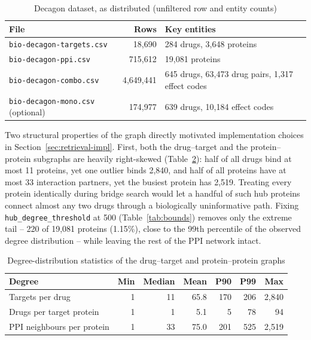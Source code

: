 \begin{table}[t]
  \caption{Decagon dataset, as distributed (unfiltered row and entity counts)}
  \label{tab:data-summary}
  \centering
  \begin{tabular}{@{}lrl@{}}
    \toprule
    File & Rows & Key entities \\
    \midrule
    \texttt{bio-decagon-targets.csv}         & 18{,}690    & 284 drugs, 3{,}648 proteins \\
    \texttt{bio-decagon-ppi.csv}             & 715{,}612   & 19{,}081 proteins \\
    \texttt{bio-decagon-combo.csv}           & 4{,}649{,}441 & 645 drugs, 63{,}473 drug pairs, 1{,}317 effect codes \\
    \texttt{bio-decagon-mono.csv} (optional) & 174{,}977   & 639 drugs, 10{,}184 effect codes \\
    \bottomrule
  \end{tabular}
\end{table}

Two structural properties of the graph directly motivated implementation
choices in Section~\ref{sec:retrieval-impl}. First, both the drug--target
and the protein--protein subgraphs are heavily right-skewed
(Table~\ref{tab:degree}): half of all drugs bind at most 11 proteins, yet
one outlier binds 2{,}840, and half of all proteins have at most 33
interaction partners, yet the busiest protein has 2{,}519. Treating every
protein identically during bridge search would let a handful of such hub
proteins connect almost any two drugs through a biologically uninformative
path. Fixing \texttt{hub\_degree\_threshold} at 500 (Table~\ref{tab:bounds})
removes only the extreme tail -- 220 of 19{,}081 proteins (1.15\%), close to
the 99th percentile of the observed degree distribution -- while leaving the
rest of the PPI network intact.

\begin{table}[t]
  \caption{Degree-distribution statistics of the drug--target and protein--protein graphs}
  \label{tab:degree}
  \centering
  \begin{tabular}{@{}lrrrrrr@{}}
    \toprule
    Degree & Min & Median & Mean & P90 & P99 & Max \\
    \midrule
    Targets per drug            & 1 & 11 & 65.8 & 170 & 206 & 2{,}840 \\
    Drugs per target protein    & 1 & 1  & 5.1  & 5   & 78  & 94 \\
    PPI neighbours per protein  & 1 & 33 & 75.0 & 201 & 525 & 2{,}519 \\
    \bottomrule
  \end{tabular}
\end{table}

